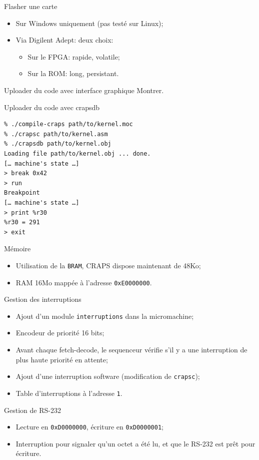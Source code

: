 \documentclass{beamer}
\begin{document}
    \begin{frame}{Flasher une carte}
      \begin{itemize}
        \item Sur Windows uniquement (pas testé sur Linux);
        \item Via Digilent Adept: deux choix:
          \begin{itemize}
            \item Sur le FPGA: rapide, volatile;
            \item Sur la ROM: long, persistant.
          \end{itemize}
      \end{itemize}
    \end{frame}

    \begin{frame}{Uploader du code avec interface graphique}
      Montrer.
    \end{frame}

    \begin{frame}[fragile]{Uploader du code avec crapsdb}
      \begin{verbatim}
% ./compile-craps path/to/kernel.moc
% ./crapsc path/to/kernel.asm
% ./crapsdb path/to/kernel.obj
Loading file path/to/kernel.obj ... done.
[… machine's state …]
> break 0x42
> run
Breakpoint
[… machine's state …]
> print %r30
%r30 = 291
> exit
      \end{verbatim}
\end{frame}

    \begin{frame}[fragile]{Mémoire}
      \begin{itemize}
        \item Utilisation de la \verb+BRAM+, CRAPS dispose maintenant de 48Ko;
        \item RAM 16Mo mappée à l'adresse \verb+0xE0000000+.
      \end{itemize}
\end{frame}

    \begin{frame}[fragile]{Gestion des interruptions}
      \begin{itemize}
        \item Ajout d'un module \verb+interruptions+ dans la micromachine;
        \item Encodeur de priorité 16 bits;
        \item Avant chaque fetch-decode, le sequenceur vérifie s'il y a une
          interruption de plus haute priorité en attente;
        \item Ajout d'une interruption software (modification de \verb+crapsc+);
        \item Table d'interruptions à l'adresse \verb+1+.
      \end{itemize}
\end{frame}

    \begin{frame}[fragile]{Gestion de RS-232}
      \begin{itemize}
        \item Lecture en \verb+0xD0000000+, écriture en \verb+0xD0000001+;
        \item Interruption pour signaler qu'un octet a été lu, et que le RS-232
          est prêt pour écriture.
      \end{itemize}
\end{frame}
\end{document}
